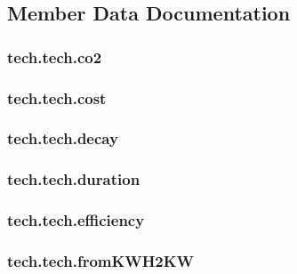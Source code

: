 \subsection{Member Data Documentation}
\hypertarget{classtech_1_1tech_a149959bdab469141c9b875d13ddc64a5}{
\subsubsection[{co2}]{\setlength{\rightskip}{0pt plus 5cm}tech.\-tech.\-co2}}\label{classtech_1_1tech_a149959bdab469141c9b875d13ddc64a5}
\hypertarget{classtech_1_1tech_ad1e77d90cb073d305f8abf2f98e88a7f}{
\subsubsection[{cost}]{\setlength{\rightskip}{0pt plus 5cm}tech.\-tech.\-cost}}\label{classtech_1_1tech_ad1e77d90cb073d305f8abf2f98e88a7f}
\hypertarget{classtech_1_1tech_a14c7c10c0d51388ca60749fb5def427e}{
\subsubsection[{decay}]{\setlength{\rightskip}{0pt plus 5cm}tech.\-tech.\-decay}}\label{classtech_1_1tech_a14c7c10c0d51388ca60749fb5def427e}
\hypertarget{classtech_1_1tech_aa9a7f1fa451b5db4940c0cd1c37bc208}{
\subsubsection[{duration}]{\setlength{\rightskip}{0pt plus 5cm}tech.\-tech.\-duration}}\label{classtech_1_1tech_aa9a7f1fa451b5db4940c0cd1c37bc208}
\hypertarget{classtech_1_1tech_afdd9963fbf98fc30ae018753e3d760cf}{
\subsubsection[{efficiency}]{\setlength{\rightskip}{0pt plus 5cm}tech.\-tech.\-efficiency}}\label{classtech_1_1tech_afdd9963fbf98fc30ae018753e3d760cf}
\hypertarget{classtech_1_1tech_a7d89b0c96cc0b4d7be2deecbc9667864}{
\subsubsection[{from\-K\-W\-H2\-K\-W}]{\setlength{\rightskip}{0pt plus 5cm}tech.\-tech.\-from\-K\-W\-H2\-K\-W}}\label{classtech_1_1tech_a7d89b0c96cc0b4d7be2deecbc9667864}
